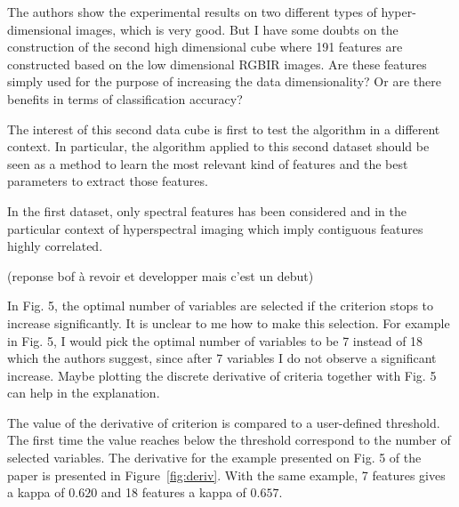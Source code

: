 \documentclass[a4paper,10pt,DIV=16]{scrartcl}
\begin{document}
\begin{revbox}
  The authors show the experimental results on two different types of hyper-dimensional images, which is very good. But I have some doubts on the construction of the second high dimensional cube where 191 features are constructed based on the low dimensional RGBIR images. Are these features simply used for the purpose of increasing the data dimensionality? Or are there benefits in terms of classification accuracy?
  \begin{resbox}
    The interest of this second data cube is first to test the algorithm in a different context. In particular, the algorithm applied to this second dataset should be seen as a method to learn the most relevant kind of features and the best parameters to extract those features.

    In the first dataset, only spectral features has been considered and in the particular context of hyperspectral imaging which imply contiguous features highly correlated.
    
    (reponse bof à revoir et developper mais c'est un debut)
  \end{resbox}
\end{revbox}


\begin{revbox}
  In Fig. 5, the optimal number of variables are selected if the criterion stops to increase significantly. It is unclear to me how to make this selection. For example in Fig. 5, I would pick the optimal number of variables to be 7 instead of 18 which the authors suggest, since after 7 variables I do not observe a significant increase. Maybe plotting the discrete derivative of criteria together with Fig. 5 can help in the explanation.
  \begin{resbox}
  The value of the derivative of criterion is compared to a user-defined threshold. The first time the value reaches below the threshold correspond to the number of selected variables. The derivative for the example presented on Fig. 5 of the paper is presented in Figure~\ref{fig:deriv}.
  With the same example, 7 features gives a kappa of $0.620$ and 18 features a kappa of $0.657$.

  \end{resbox}
\end{revbox}
\end{document}
